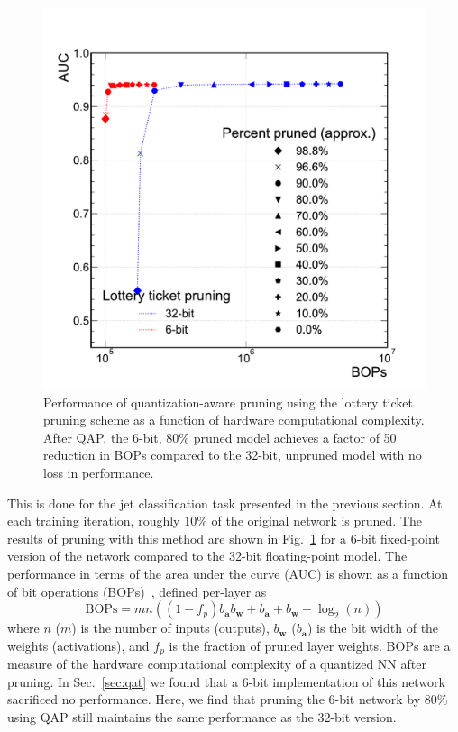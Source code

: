 \documentclass[tinyml]{acmart}
\renewcommand{\vec}[1]{\boldsymbol{#1}}
\begin{document}
\begin{figure}[t!]
\centering
\includegraphics[width=0.7\columnwidth]{Figs/AUCROC_FT_vs_LT_6b32b_v2.pdf}
\caption{Performance of quantization-aware pruning using the lottery ticket pruning scheme as a function of hardware computational complexity.
After QAP, the 6-bit, 80\% pruned model achieves a factor of 50 reduction in BOPs compared to the 32-bit, unpruned model with no loss in performance.}
\label{fig:qap}
\end{figure}

This is done for the jet classification task presented in the previous section.
At each training iteration, roughly 10\% of the original network is pruned.
The results of pruning with this method are shown in Fig.~\ref{fig:qap} for a 6-bit fixed-point version of the network compared to the 32-bit floating-point model.
The performance in terms of the area under the curve (AUC) is shown as a function of bit operations (BOPs)~\cite{bops}, defined per-layer as
\begin{equation}
    \mathrm{BOPs} = mn((1-f_p)b_{\vec{a}}b_{\vec{w}} + b_{\vec{a}} + b_{\vec{w}} + \log_2(n))
\end{equation}
where $n$ ($m$) is the number of inputs (outputs), $b_{\vec{w}}$ ($b_{\vec{a}}$) is the bit width of the weights (activations), and $f_p$ is the fraction of pruned layer weights.
BOPs are a measure of the hardware computational complexity of a quantized NN after pruning.
In Sec.~\ref{sec:qat} we found that a 6-bit implementation of this network sacrificed no performance. 
Here, we find that pruning the 6-bit network by 80\% using QAP still maintains the same performance as the 32-bit version.
\end{document}

